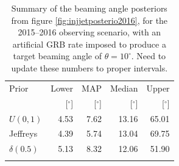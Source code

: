\documentclass[twocolumn,nofootinbib]{revtex4-1}
\newcommand{\dwnote}[1]{{\color{dwnote}{[\textbf{DW}: #1]}}}
\renewcommand{\dwnote}{}
\begin{document}
\begin{table}
  \centering
  \begin{tabular}{lrrrr}
    \toprule
    Prior & Lower & MAP & Median & Upper\\
          & [$^\circ$] & [$^\circ$]& [$^\circ$]& [$^\circ$] \\
    \colrule
    \(U(0,1)\) & 4.53 & 7.62 & 13.16 & 65.01\\
    Jeffreys & 4.39 & 5.74 & 13.04 & 69.75\\
    $\delta(0.5)$ & 5.13 & 8.32 & 12.06 & 51.90\\
    \botrule
\end{tabular}
\caption{Summary of the beaming angle posteriors from figure
  \ref{fig:injjetposterio2016}, for the 2015--2016 observing scenario,
  with an artificial GRB rate imposed to produce a target beaming
  angle of $\theta = 10^{\circ}$.   \dwnote{Need to update these numbers to proper intervals.}}
  \label{tab:summaryinj2015}
\end{table}

%
\end{document}
